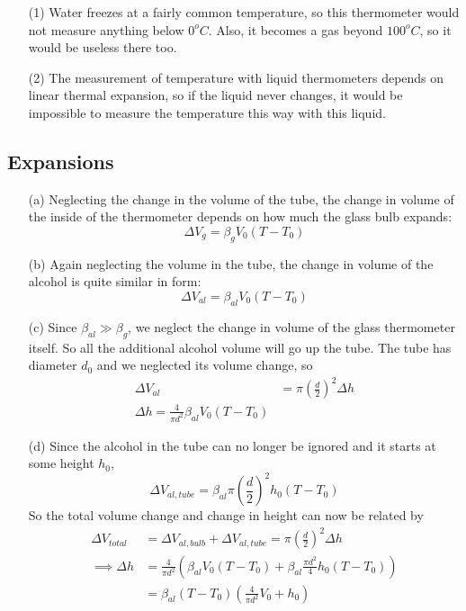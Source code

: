 \documentclass{article}
\begin{document}
\begin{itemize}
	\item[(1)] Water freezes at a fairly common temperature, so this thermometer would not measure anything below $0^o C$. Also, it becomes a gas beyond $100^o C$, so it would be useless there too.
	\item[(2)] The measurement of temperature with liquid thermometers depends on linear thermal expansion, so if the liquid never changes, it would be impossible to measure the temperature this way with this liquid.
\end{itemize}

\subsection{Expansions}

\begin{itemize}
	\item[(a)] Neglecting the change in the volume of the tube, the change in volume of the inside of the thermometer depends on how much the glass bulb expands:
	\begin{equation}
	\Delta V_g = \beta_g V_0 (T-T_0)
	\end{equation}
	\item[(b)] Again neglecting the volume in the tube, the change in volume of the alcohol is quite similar in form:
	\begin{equation}
	\Delta V_{al} = \beta_{al} V_0 (T-T_0)
	\end{equation}
	\item[(c)] Since $\beta_{al}\gg \beta_g$, we neglect the change in volume of the glass thermometer itself. So all the additional alcohol volume will go up the tube. The tube has diameter $d_0$ and we neglected its volume change, so
	\begin{align*}
	\Delta V_{al} &= \pi\left(\frac{d}{2}\right)^2\Delta h \\
	\Delta h = \frac{4}{\pi d^2} \beta_{al} V_0 (T-T_0)
	\end{align*}
	\item[(d)] Since the alcohol in the tube can no longer be ignored and it starts at some height $h_0$,
	\begin{equation}
	\Delta V_{al,tube} = \beta_{al}\pi\left(\frac{d}{2}\right)^2h_0(T-T_0)
	\end{equation}
	So the total volume change and change in height can now be related by
	\begin{align*}
	\Delta V_{total} &= \Delta V_{al,bulb} + \Delta V_{al,tube} = \pi\left(\frac{d}{2}\right)^2\Delta h \\
	\implies \Delta h &= \frac{4}{\pi d^2}(\beta_{al} V_0(T-T_0) + \beta_{al}\frac{\pi d^2}{4} h_0(T-T_0)) \\
	&= \beta_{al} (T-T_0)\left(\frac{4}{\pi d^2} V_0 + h_0\right)
	\end{align*}
\end{itemize}
\end{document}
